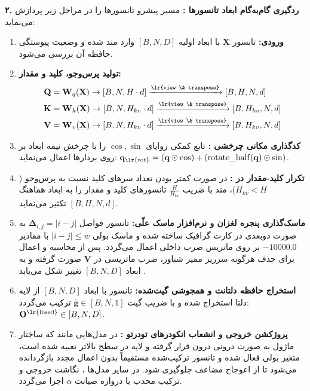 \textbf{۲. ردگیری گام‌به‌گام ابعاد تانسورها :}
مسیر پیشرو  تانسورها را در مراحل زیر پردازش می‌نماید:
\begin{enumerate}
    \item \textbf{ورودی:} تانسور $\mathbf{X}$ با ابعاد اولیه $[B, N, D]$ وارد متد شده و وضعیت پیوستگی حافظه  آن بررسی می‌شود.
    \item \textbf{تولید پرس‌وجو، کلید و مقدار:}
    \begin{align*}
        \mathbf{Q} &= \mathbf{W}_q(\mathbf{X}) \to [B, N, H \cdot d] \xrightarrow{\text{\lr{view \& transpose}}} [B, H, N, d] \\
        \mathbf{K} &= \mathbf{W}_k(\mathbf{X}) \to [B, N, H_{kv} \cdot d] \xrightarrow{\text{\lr{view \& transpose}}} [B, H_{kv}, N, d] \\
        \mathbf{V} &= \mathbf{W}_v(\mathbf{X}) \to [B, N, H_{kv} \cdot d] \xrightarrow{\text{\lr{view \& transpose}}} [B, H_{kv}, N, d]
    \end{align*}
    \item \textbf{کدگذاری مکانی چرخشی :} تابع کمکی  زوایای $\cos, \sin$ را با چرخش نیمه ابعاد بر روی بردارها اعمال می‌نماید: $\mathbf{q}_{\text{\lr{rot}}} = (\mathbf{q} \odot \cos) + (\operatorname{rotate\_half}(\mathbf{q}) \odot \sin)$.
    \item \textbf{تکرار کلید-مقدار در :} در صورت کمتر بودن تعداد سرهای کلید نسبت به پرس‌وجو ($H_{kv} < H$)، متد  با ضریب $\frac{H}{H_{kv}}$ تانسورهای کلید و مقدار را به ابعاد هماهنگ $[B, H, N, d]$ تکثیر می‌نماید.
    \item \textbf{ماسک‌گذاری پنجره لغزان و نرم‌افزار ماسک علّی:} تانسور فواصل $\mathbf{\Delta}_{i, j} = |i - j|$ به صورت دوبعدی در کارت گرافیک ساخته شده و ماسک بولی $|i - j| \le w$ با مقادیر $-10000.0$ بر روی ماتریس ضرب داخلی اعمال می‌گردد. پس از محاسبه  و اعمال  برای حذف هرگونه سرریز ممیز شناور، ضرب ماتریسی در $\mathbf{V}$ صورت گرفته و به ابعاد $[B, N, D]$ تغییر شکل می‌یابد .
    \item \textbf{استخراج حافظه دلتانت و همجوشی گیت‌شده:} تانسور  با ابعاد $[B, N, D]$ از لایه دلتا استخراج شده و با ضریب گیت $\bar{\mathbf{g}} \in [B, N, 1]$ ترکیب می‌گردد: $\mathbf{O}^{\text{\lr{fused}}} \in [B, N, D]$.
    \item \textbf{پروژکشن خروجی و انشعاب انکودرهای تودرتو :} در مدل‌هایی مانند  که ساختار ماژول به صورت درونی درون  قرار گرفته و لایه  در سطح بالاتر تعبیه شده است، متغیر بولی  فعال شده و تانسور ترکیب‌شده مستقیماً بدون اعمال مجدد  بازگردانده می‌شود تا از اعوجاج مضاعف جلوگیری شود. در سایر مدل‌ها ، نگاشت خروجی و ترکیب محدب با دروازه صیانت $\alpha$ اجرا می‌گردد.
\end{enumerate}

